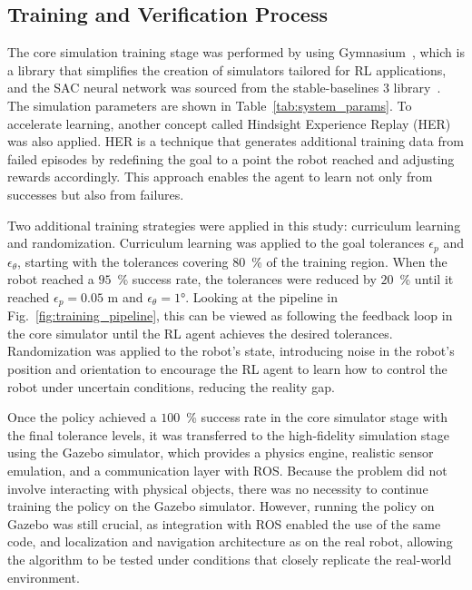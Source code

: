 \subsection{Training and Verification Process}

The core simulation training stage was performed by using Gymnasium~\cite{towers2024gymnasium}, which is a library that simplifies the creation of simulators tailored for RL applications, and the SAC neural network was sourced from the stable-baselines 3 library~\cite{stable-baselines3}. The simulation parameters are shown in Table~\ref{tab:system_params}. To accelerate learning, another concept called Hindsight Experience Replay (HER)~\cite{andrychowicz2017hindsight} was also applied. HER is a technique that generates additional training data from failed episodes by redefining the goal to a point the robot reached and adjusting rewards accordingly. This approach enables the agent to learn not only from successes but also from failures.

Two additional training strategies were applied in this study: curriculum learning and randomization. Curriculum learning was applied to the goal tolerances $\epsilon_p$ and $\epsilon_\theta$, starting with the tolerances covering $80$~\% of the training region. When the robot reached a $95$~\% success rate, the tolerances were reduced by $20$~\% until it reached $\epsilon_p = 0.05$ m and $\epsilon_\theta = \ang{1}$. Looking at the pipeline in Fig.\ \ref{fig:training_pipeline}, this can be viewed as following the feedback loop in the core simulator until the RL agent achieves the desired tolerances. Randomization was applied to the robot's state, introducing noise in the robot's position and orientation to encourage the RL agent to learn how to control the robot under uncertain conditions, reducing the reality gap.

Once the policy achieved a $100$~\% success rate in the core simulator stage with the final tolerance levels, it was transferred to the high-fidelity simulation stage using the Gazebo simulator, which provides a physics engine, realistic sensor emulation, and a communication layer with ROS. Because the problem did not involve interacting with physical objects, there was no necessity to continue training the policy on the Gazebo simulator. However, running the policy on Gazebo was still crucial, as integration with ROS enabled the use of the same code, and localization and navigation architecture as on the real robot, allowing the algorithm to be tested under conditions that closely replicate the real-world environment. %

